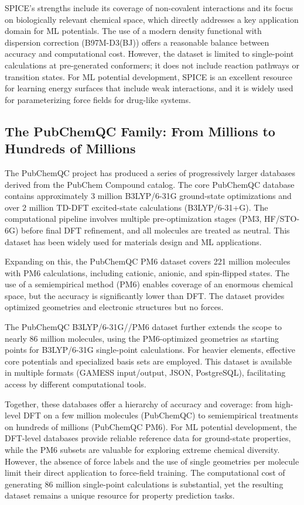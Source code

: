 \documentclass[12pt]{article}
\begin{document}
SPICE’s strengths include its coverage of non-covalent interactions and its focus on biologically relevant chemical space, which directly addresses a key application domain for ML potentials. The use of a modern density functional with dispersion correction (B97M-D3(BJ)) offers a reasonable balance between accuracy and computational cost. However, the dataset is limited to single-point calculations at pre-generated conformers; it does not include reaction pathways or transition states. For ML potential development, SPICE is an excellent resource for learning energy surfaces that include weak interactions, and it is widely used for parameterizing force fields for drug-like systems.

\subsection{The PubChemQC Family: From Millions to Hundreds of Millions}

The PubChemQC project has produced a series of progressively larger databases derived from the PubChem Compound catalog. The core PubChemQC database \cite{ds13-28} contains approximately 3 million B3LYP/6-31G ground-state optimizations and over 2 million TD-DFT excited-state calculations (B3LYP/6-31+G). The computational pipeline involves multiple pre-optimization stages (PM3, HF/STO-6G) before final DFT refinement, and all molecules are treated as neutral. This dataset has been widely used for materials design and ML applications.

Expanding on this, the PubChemQC PM6 dataset \cite{ds14-29} covers 221 million molecules with PM6 calculations, including cationic, anionic, and spin-flipped states. The use of a semiempirical method (PM6) enables coverage of an enormous chemical space, but the accuracy is significantly lower than DFT. The dataset provides optimized geometries and electronic structures but no forces.

The PubChemQC B3LYP/6-31G//PM6 dataset \cite{ds15-27} further extends the scope to nearly 86 million molecules, using the PM6-optimized geometries as starting points for B3LYP/6-31G single-point calculations. For heavier elements, effective core potentials and specialized basis sets are employed. This dataset is available in multiple formats (GAMESS input/output, JSON, PostgreSQL), facilitating access by different computational tools.

Together, these databases offer a hierarchy of accuracy and coverage: from high-level DFT on a few million molecules (PubChemQC) to semiempirical treatments on hundreds of millions (PubChemQC PM6). For ML potential development, the DFT-level databases provide reliable reference data for ground-state properties, while the PM6 subsets are valuable for exploring extreme chemical diversity. However, the absence of force labels and the use of single geometries per molecule limit their direct application to force-field training. The computational cost of generating 86 million single-point calculations is substantial, yet the resulting dataset remains a unique resource for property prediction tasks.
\end{document}
